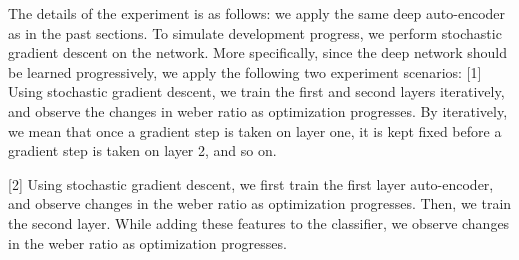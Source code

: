 \documentclass[10pt]{article}
\begin{document}
The details of the experiment is as follows: we apply the same deep auto-encoder as in the past sections. To simulate development progress, we perform stochastic gradient descent on the network. More specifically, since the deep network should be learned progressively, we apply the following two experiment scenarios: 
[1] Using stochastic gradient descent, we train the first and second layers iteratively, and observe the changes in weber ratio as optimization progresses. By iteratively, we mean that once a gradient step is taken on layer one, it is kept fixed before a gradient step is taken on layer 2, and so on.

[2] Using stochastic gradient descent, we first train the first layer auto-encoder, and observe changes in the weber ratio as optimization progresses. Then, we train the second layer. While adding these features to the classifier, we observe changes in the weber ratio as optimization progresses. 

{\small  }
\end{document}
